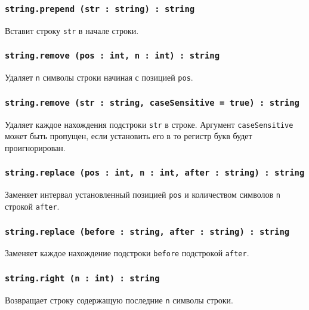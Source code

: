\subsubsection{\texttt{string.prepend (str : string) : string}}

Вставит строку \texttt{str} в начале строки.

\subsubsection{\texttt{string.remove (pos : int, n : int) : string}}

Удаляет \texttt{n} символы строки начиная с позицией \texttt{pos}.

\subsubsection{\texttt{string.remove (str : string, caseSensitive = true) : string}}

Удаляет каждое нахождения подстроки \texttt{str} в строке. Аргумент \texttt{caseSensitive} может быть пропущен, если установить его в \false{} то регистр букв будет проигнорирован.

\subsubsection{\texttt{string.replace (pos : int, n : int, after : string) : string}}

Заменяет интервал установленный позицией \texttt{pos} и количеством символов \texttt{n} строкой \texttt{after}.

\subsubsection{\texttt{string.replace (before : string, after : string) : string}}

Заменяет каждое нахождение подстроки \texttt{before} подстрокой \texttt{after}.

\subsubsection{\texttt{string.right (n : int) : string}}

Возвращает строку содержащую последние \texttt{n} символы строки.

